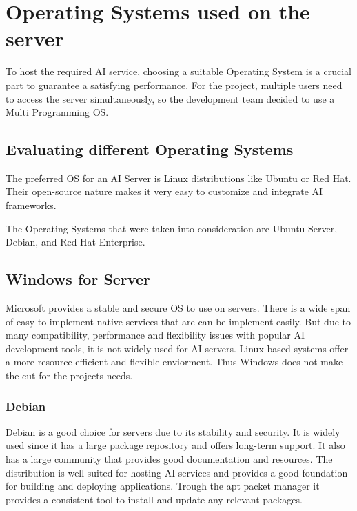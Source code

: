 \cite{Kernel}



\section {Operating Systems used on the server}

To host the required AI service, choosing a suitable Operating System is a crucial part to guarantee a satisfying performance.
For the project, multiple users need to access the server simultaneously, so the development team decided to use a Multi Programming OS.

\subsection {Evaluating different Operating Systems}

The preferred OS for an AI Server is Linux distributions like Ubuntu or Red Hat.
Their open-source nature makes it very easy to customize and integrate AI frameworks.

The Operating Systems that were taken into consideration are Ubuntu Server, Debian, and Red Hat Enterprise. 

\cite{LinuxPoweredAi}


\subsection{Windows for Server}

Microsoft provides a stable and secure OS to use on servers. There is a wide span of easy to implement native services that are can be implement easily.
But due to many compatibility, performance and flexibility issues with popular AI development tools, it is not widely used for AI servers. 
Linux based systems offer a more resource efficient and flexible enviorment. Thus Windows does not make the cut for the projects needs.

\subsubsection{Debian}

Debian is a good choice for servers due to its stability and security. It is widely used since it has a large package repository and offers long-term support. It also has a large community that provides good documentation and resources. The distribution is well-suited for hosting AI services and provides a good foundation for building and deploying applications.
Trough the apt packet manager it provides a consistent tool to install and update any relevant packages.

